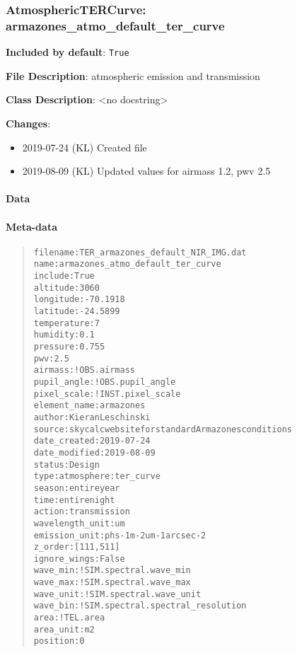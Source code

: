 \subsubsection{AtmosphericTERCurve: \textquotedbl{}armazones\_atmo\_default\_ter\_curve\textquotedbl{}%
  \label{atmospherictercurve-armazones-atmo-default-ter-curve}%
}

\textbf{Included by default}: \texttt{True}

\textbf{File Description}: atmospheric emission and transmission

\textbf{Class Description}: <no docstring>

\textbf{Changes}:

\begin{itemize}
\item 2019-07-24 (KL) Created file

\item 2019-08-09 (KL) Updated values for airmass 1.2, pwv 2.5
\end{itemize}


\paragraph{Data%
  \label{data}%
}


\paragraph{Meta-data%
  \label{meta-data}%
}

\begin{quote}
\begin{alltt}
       filename : TER_armazones_default_NIR_IMG.dat
           name : armazones_atmo_default_ter_curve
        include : True
       altitude : 3060
      longitude : -70.1918
       latitude : -24.5899
    temperature : 7
       humidity : 0.1
       pressure : 0.755
            pwv : 2.5
        airmass : !OBS.airmass
    pupil_angle : !OBS.pupil_angle
    pixel_scale : !INST.pixel_scale
   element_name : armazones
         author : Kieran Leschinski
         source : skycalc website for standard Armazones conditions
   date_created : 2019-07-24
  date_modified : 2019-08-09
         status : Design
           type : atmosphere:ter_curve
         season : entire year
           time : entire night
         action : transmission
wavelength_unit : um
  emission_unit : ph s-1 m-2 um-1 arcsec-2
        z_order : [111, 511]
   ignore_wings : False
       wave_min : !SIM.spectral.wave_min
       wave_max : !SIM.spectral.wave_max
      wave_unit : !SIM.spectral.wave_unit
       wave_bin : !SIM.spectral.spectral_resolution
           area : !TEL.area
      area_unit : m2
       position : 0
\end{alltt}
\end{quote}


